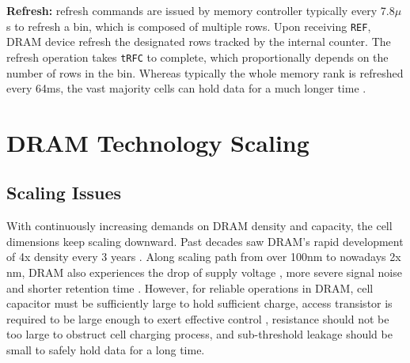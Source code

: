 \textbf{Refresh:}
refresh commands are issued by memory controller typically every 7.8$\mu$s to refresh a bin, which is composed of multiple rows.
Upon receiving {\tt REF}, DRAM device refresh the designated rows tracked by the internal counter.
The refresh operation takes {\tt tRFC} to complete, which proportionally depends on the number of rows in the bin.
Whereas typically the whole memory rank is refreshed every 64ms, the vast majority cells can hold data for a much longer time \cite{ISCA12:raidr, ISCA15:reflex}.

\section{DRAM Technology Scaling}
\subsection{Scaling Issues}
With continuously increasing demands on DRAM density and capacity, the cell dimensions keep scaling downward.
Past decades saw DRAM's rapid development of 4x density every 3 years \cite{BOOK:cod}. 
Along scaling path from over 100nm to nowadays 2x nm, DRAM also experiences the drop of supply voltage \cite{HPCA16:twr}, more severe signal noise \cite{ISQED08:offset, ISCA13:ddr4} and shorter retention time \cite{ISCA13:archshield, PATENT15:twr}.
However, for reliable operations in DRAM, cell capacitor must be sufficiently large to hold sufficient charge, access transistor is required to be large enough to exert effective control \cite{ISCA09:pcm}, resistance should not be too large to obstruct cell charging process, and sub-threshold leakage should be small to safely hold data for a long time.


